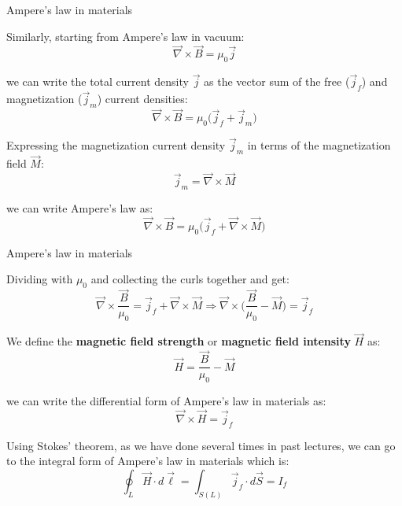 %
%
%
%

\begin{frame}{Ampere's law in materials}

Similarly, starting from Ampere's law in vacuum:
\begin{equation*}
  \vec{\nabla} \times \vec{B} = \mu_0 \vec{j}
\end{equation*}

we can write the total current density $\vec{j}$ as the vector sum of the free ($\vec{j}_{f}$)
and magnetization ($\vec{j}_{m}$) current densities:
\begin{equation*}
  \vec{\nabla} \times \vec{B} = \mu_0 \Big( \vec{j}_{f} + \vec{j}_{m} \Big)
\end{equation*}

Expressing the magnetization current density $\vec{j}_{m}$ in terms of the
magnetization field $\vec{M}$:
\begin{equation*}
  \vec{j}_{m} = \vec{\nabla} \times \vec{M}
\end{equation*}

we can write Ampere's law as:
\begin{equation*}
  \vec{\nabla} \times \vec{B} = \mu_0 \Big( \vec{j}_{f} + \vec{\nabla} \times \vec{M} \Big)
\end{equation*}

\end{frame}


%
%
%

\begin{frame}{Ampere's law in materials}

Dividing with $\mu_0$ and collecting the curls together and get:
\begin{equation*}
  \vec{\nabla} \times \frac{\vec{B}}{\mu_0} = \vec{j}_{f} + \vec{\nabla} \times \vec{M} \Rightarrow
  \vec{\nabla} \times \Big( \frac{\vec{B}}{\mu_0} - \vec{M} \Big) = \vec{j}_{f}
\end{equation*}

We define the {\bf magnetic field strength} or {\bf magnetic field intensity} $\vec{H}$ as:
\begin{equation*}
  \vec{H} = \frac{\vec{B}}{\mu_0} - \vec{M}
\end{equation*}

we can write the differential form of Ampere's law in materials as:
\begin{equation*}
  \vec{\nabla} \times \vec{H} = \vec{j}_{f}
\end{equation*}

Using Stokes' theorem, as we have done several times in past lectures,
we can go to the integral form of Ampere's law in materials which is:
\begin{equation*}
  \oint_{L} \vec{H} \cdot d\vec{\ell} = \int_{S(L)} \vec{j}_{f} \cdot d\vec{S} = I_{f}
\end{equation*}

\end{frame}

